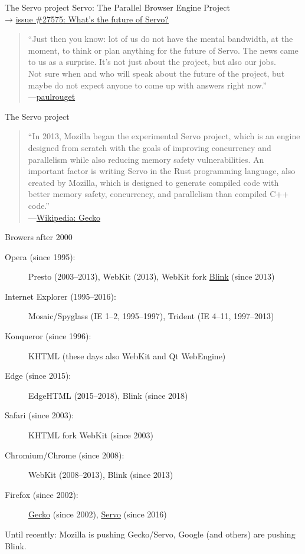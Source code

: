 \documentclass{beamer}
\begin{document}
\begin{frame}[fragile]{The Servo project}
  Servo: The Parallel Browser Engine Project \\
  → \href{https://github.com/servo/servo/discussions/27575}{issue \#27575: What's the future of Servo?}
  \begin{quote}
    “Just then you know: lot of us do not have the mental bandwidth, at the moment, to think or plan anything for the future of Servo. The news came to us as a surprise. It's not just about the project, but also our jobs. \\
    Not sure when and who will speak about the future of the project, but maybe do not expect anyone to come up with answers right now.” \\
    ---\href{https://github.com/servo/servo/discussions/27575#discussioncomment-50461}{paulrouget}
  \end{quote}
\end{frame}

\begin{frame}[fragile]{The Servo project}
  \begin{quote}
    “In 2013, Mozilla began the experimental Servo project, which is an engine designed from scratch with the goals of improving concurrency and parallelism while also reducing memory safety vulnerabilities. An important factor is writing Servo in the Rust programming language, also created by Mozilla, which is designed to generate compiled code with better memory safety, concurrency, and parallelism than compiled C++ code.” \\
    ---\href{https://en.wikipedia.org/w/index.php?title=Gecko_(software)&oldid=967690910#Background}{Wikipedia: Gecko}
  \end{quote}
\end{frame}

\begin{frame}[fragile]{Browers after 2000}
  \begin{description}
    \item[Opera (since 1995):] Presto (2003--2013), WebKit (2013), WebKit fork \href{https://chromium.googlesource.com/chromium/src/+/master/third_party/blink/}{Blink} (since 2013)
    \item[Internet Explorer (1995--2016):] Mosaic/Spyglass (IE 1--2, 1995--1997), Trident (IE 4--11, 1997--2013)
    \item[Konqueror (since 1996):] KHTML (these days also WebKit and Qt WebEngine)
    \item[Edge (since 2015):] EdgeHTML (2015--2018), Blink (since 2018)
    \item[Safari (since 2003):] KHTML fork WebKit (since 2003)
    \item[Chromium/Chrome (since 2008):] WebKit (2008--2013), Blink (since 2013)
    \item[Firefox (since 2002):] \href{https://developer.mozilla.org/en-US/docs/Mozilla/Gecko}{Gecko} (since 2002), \href{https://github.com/servo/servo}{Servo} (since 2016)
  \end{description}

  Until recently: Mozilla is pushing Gecko/Servo, Google (and others) are pushing Blink.
\end{frame}
\end{document}
